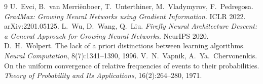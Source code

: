 \documentclass[11pt,a4paper]{article}
\begin{document}
\begin{thebibliography}{9}
 U.~Evci, B.~van Merri\"enboer, T.~Unterthiner, M.~Vladymyrov, F.~Pedregosa. \emph{GradMax: Growing Neural Networks using Gradient Information}. ICLR 2022. arXiv:2201.05125.
 L.~Wu, D.~Wang, Q.~Liu. \emph{Firefly Neural Architecture Descent: a General Approach for Growing Neural Networks}. NeurIPS 2020.
 D.~H.~Wolpert. The lack of a priori distinctions between learning algorithms. \emph{Neural Computation}, 8(7):1341--1390, 1996.
 V.~N.~Vapnik, A.~Ya.~Chervonenkis. On the uniform convergence of relative frequencies of events to their probabilities. \emph{Theory of Probability and Its Applications}, 16(2):264--280, 1971.
\end{thebibliography}
\end{document}
